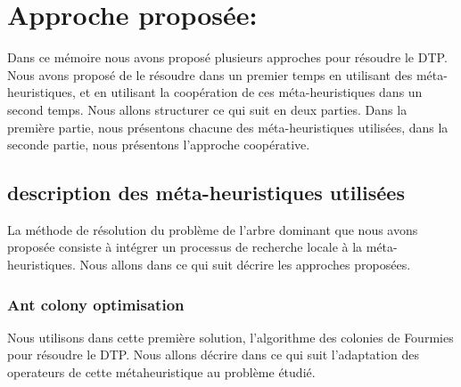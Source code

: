 \section{Approche proposée:}
Dans ce mémoire nous avons proposé plusieurs approches pour résoudre le DTP. Nous avons proposé de le résoudre dans un premier temps en utilisant des méta-heuristiques, et en utilisant la coopération de ces méta-heuristiques dans un second temps. Nous allons structurer ce qui suit en deux parties. Dans la première partie, nous présentons chacune des méta-heuristiques utilisées, dans la seconde partie, nous présentons l'approche coopérative.


\subsection{description des méta-heuristiques utilisées}
La méthode de résolution du problème de l’arbre dominant que nous avons proposée consiste à intégrer un processus de recherche locale  à la méta-heuristiques. Nous allons dans ce qui suit décrire les approches proposées. 

\subsubsection{Ant colony optimisation}
Nous utilisons dans cette première solution, l'algorithme des colonies de Fourmies pour résoudre le DTP. Nous allons décrire dans ce qui suit l'adaptation des operateurs de  cette métaheuristique au problème étudié. 

